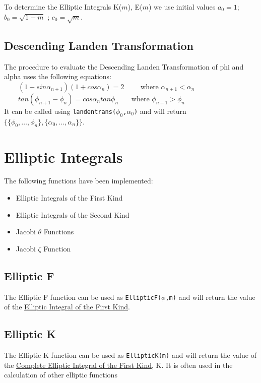 \documentclass[11pt]{article}
\begin{document}
To determine the Elliptic Integrals K($m$), E($m$) we use initial values
\(a_0 = 1\); \(b_0 = \sqrt{1-m}\) ; \(c_0 = \sqrt{m}\).


\subsection{Descending Landen Transformation}

The procedure to evaluate the Descending Landen Transformation of 
phi and alpha uses the following equations:\\
\indent \ \ \ \ \( (1+sin \alpha_{n+1})(1+cos \alpha_n)=2 \) 
\ \ \ \ where \(\alpha_{n+1}<\alpha_n\) \\
\indent \ \ \ \ \(tan(\phi_{n+1}-\phi_n)=cos \alpha_n tan \phi_n \) 
\ \ \ where \(\phi_{n+1}>\phi_n\) \\

It can be called using {\tt landentrans($\phi_0$,$\alpha_0$)}
and will return \\
$\{\{\phi_0, \ldots ,\phi_n\},\{\alpha_0, \ldots ,\alpha_n\}\}$.

\section{Elliptic Integrals}
The following functions have been implemented:

\begin{itemize}
\item Elliptic Integrals of the First Kind
\item Elliptic Integrals of the Second Kind
\item Jacobi $\theta$ Functions
\item Jacobi $\zeta$ Function
\end{itemize}

\subsection{Elliptic F}

The Elliptic F function can be used as {\tt EllipticF($\phi$,m)} and 
will return the value of the {\underline {Elliptic Integral of the 
First Kind}}.

\subsection{Elliptic K}

The Elliptic K function can be used as {\tt EllipticK(m)} and will 
return the value of the {\underline {Complete Elliptic Integral of the
First Kind}}, K. It is often used in the calculation of other elliptic
functions
\end{document}
